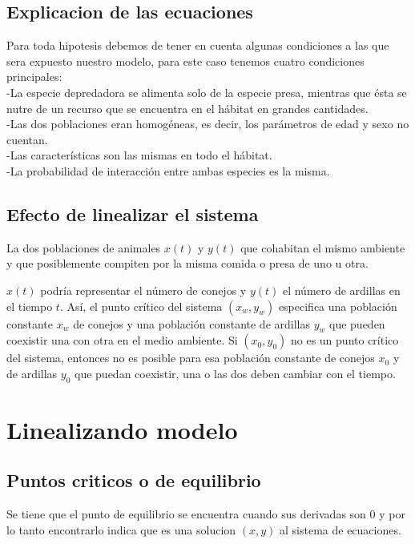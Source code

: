 \documentclass{report}
\begin{document}
\subsection{Explicacion de las ecuaciones}

Para toda hipotesis debemos de tener en cuenta algunas condiciones a las que sera expuesto nuestro modelo, para este caso tenemos cuatro condiciones principales:\\
-La especie depredadora se alimenta solo de la especie presa, mientras que ésta se nutre de un recurso que se encuentra en el hábitat en grandes cantidades.\\
-Las dos poblaciones eran homogéneas, es decir, los parámetros de edad y sexo no cuentan.\\
-Las características son las mismas en todo el hábitat.\\
-La probabilidad de interacción entre ambas especies es la misma.\\
\subsection*{Efecto de linealizar el sistema}

La dos poblaciones de animales $x(t)$ y $y(t)$ que cohabitan el mismo ambiente y que
posiblemente compiten por la misma comida o presa de uno u otra.

 $x(t)$ podría representar el número de conejos y $y(t)$ el número de ardillas en el tiempo $t$. Así, el punto crítico del sistema $(x_w , y_w )$ especifica una población constante $x_w$ de conejos y una población constante de ardillas $y_w$ que pueden coexistir una con otra en el medio ambiente. Si $(x_0 , y_0 )$ no es un punto crítico del sistema, entonces no es posible para esa población constante de conejos $x_0$ y de ardillas $y_0$ que puedan coexistir, una o las dos deben cambiar con el tiempo.

\section{Linealizando modelo}
\subsection{Puntos criticos o de equilibrio}
Se tiene que el punto de equilibrio se encuentra cuando sus derivadas son 0 y por lo tanto encontrarlo indica que es una solucion $(x,y)$ al sistema de ecuaciones.
\end{document}
